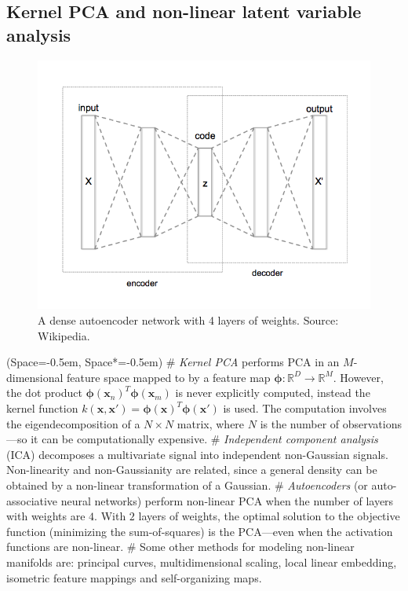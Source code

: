 \documentclass[12pt, a4paper]{article}
\newcommand{\listSpace}{-0.5em}%
\newcommand{\R}{\mathbb{R}}
\newcommand{\vect}[1]{\bm{#1}}
\begin{document}
\subsection*{Kernel PCA and non-linear latent variable analysis}

\begin{figure}[ht!]
	\centering
	\includegraphics[width=0.6\linewidth]{figs/autoencoder.png}
	\caption{A dense autoencoder network with 4 layers of weights.
		Source: Wikipedia.}
	\label{fig:autoencoder}
\end{figure}
		
		
\begin{easylist}[itemize]
	\ListProperties(Space=\listSpace, Space*=\listSpace)
	# \emph{Kernel PCA} performs PCA in an $M$-dimensional feature space mapped to by a feature map $\vect{\phi}:\R^D \to  \R^M$.
	However, the dot product $\vect{\phi}(\vect{x}_n)^T \vect{\phi}(\vect{x}_m)$ is never explicitly computed, instead the kernel function $k (\vect{x}, \vect{x}') = \vect{\phi}(\vect{x})^T \vect{\phi}(\vect{x}')$ is used.
	The computation involves the eigendecomposition of a $N \times N$ matrix, where $N$ is the number of observations---so it can be computationally expensive.
	# \emph{Independent component analysis} (ICA) decomposes a multivariate signal into independent non-Gaussian signals.
	Non-linearity and non-Gaussianity are related, since a general density can be obtained by a non-linear transformation of a Gaussian.
	# \emph{Autoencoders} (or auto-associative neural networks) perform non-linear PCA when the number of layers with weights are $4$.
	With $2$ layers of weights, the optimal solution to the objective function (minimizing the sum-of-squares) is the PCA---even when the activation functions are non-linear.
	# Some other methods for modeling non-linear manifolds are: 
	principal curves, 
	multidimensional scaling, 
	local linear embedding, 
	isometric feature mappings and 
	self-organizing maps.
\end{easylist}
\end{document}
